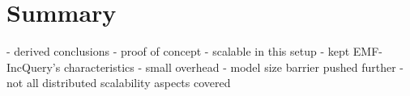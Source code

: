 \section{Summary}

  - derived conclusions
    - proof of concept
    - scalable in this setup
    - kept EMF-IncQuery's characteristics
    - small overhead
    - model size barrier pushed further
    - not all distributed scalability aspects covered
    
